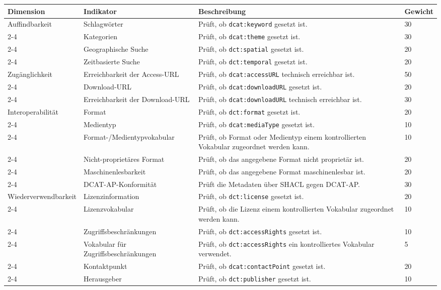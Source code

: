 {
\renewcommand{\arraystretch}{1.2}
\centering
\begin{table}[H]
\scriptsize
\centering
\begin{tabular}{|p{2.5cm}|p{3.4cm}|p{5.8cm}|p{1.2cm}|}
\hline
\textbf{Dimension} & \textbf{Indikator} & \textbf{Beschreibung} & \textbf{Gewicht} \\
\hline

Auffindbarkeit 
& Schlagwörter 
& Prüft, ob \texttt{dcat:keyword} gesetzt ist. 
& 30 \\ \cline{2-4}
& Kategorien 
& Prüft, ob \texttt{dcat:theme} gesetzt ist. 
& 30 \\ \cline{2-4}
& Geographische Suche 
& Prüft, ob \texttt{dct:spatial} gesetzt ist. 
& 20 \\ \cline{2-4}
& Zeitbasierte Suche 
& Prüft, ob \texttt{dct:temporal} gesetzt ist. 
& 20 \\
\hline

Zugänglichkeit 
& Erreichbarkeit der Access-URL 
& Prüft, ob \texttt{dcat:accessURL} technisch erreichbar ist. 
& 50 \\ \cline{2-4}
& Download-URL 
& Prüft, ob \texttt{dcat:downloadURL} gesetzt ist. 
& 20 \\ \cline{2-4}
& Erreichbarkeit der Download-URL 
& Prüft, ob \texttt{dcat:downloadURL} technisch erreichbar ist. 
& 30 \\
\hline

Interoperabilität 
& Format
& Prüft, ob \texttt{dct:format} gesetzt ist.
& 20 \\ \cline{2-4}
& Medientyp 
& Prüft, ob \texttt{dcat:mediaType} gesetzt ist. 
& 10 \\ \cline{2-4}
& Format-/Medientypvokabular 
& Prüft, ob Format oder Medientyp einem kontrollierten Vokabular zugeordnet werden kann. 
& 10 \\ \cline{2-4}
& Nicht-proprietäres Format 
& Prüft, ob das angegebene Format nicht proprietär ist. 
& 20 \\ \cline{2-4}
& Maschinenlesbarkeit 
& Prüft, ob das angegebene Format maschinenlesbar ist. 
& 20 \\ \cline{2-4}
& DCAT-AP-Konformität 
& Prüft die Metadaten über SHACL gegen DCAT-AP. 
& 30 \\
\hline

Wiederverwendbarkeit 
& Lizenzinformation 
& Prüft, ob \texttt{dct:license} gesetzt ist. 
& 20 \\ \cline{2-4}
& Lizenzvokabular 
& Prüft, ob die Lizenz einem kontrollierten Vokabular zugeordnet werden kann. 
& 10 \\ \cline{2-4}
& Zugriffsbeschränkungen 
& Prüft, ob \texttt{dct:accessRights} gesetzt ist. 
& 10 \\ \cline{2-4}
& Vokabular für Zugriffsbeschränkungen 
& Prüft, ob \texttt{dct:accessRights} ein kontrolliertes Vokabular verwendet. 
& 5 \\ \cline{2-4}
& Kontaktpunkt 
& Prüft, ob \texttt{dcat:contactPoint} gesetzt ist. 
& 20 \\ \cline{2-4}
& Herausgeber 
& Prüft, ob \texttt{dct:publisher} gesetzt ist. 
& 10 \\
\hline


\end{tabular}
\end{table}}

